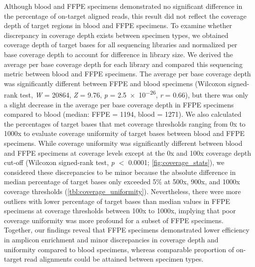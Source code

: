Although blood and FFPE specimens demonstrated no significant difference in the percentage of on-target aligned reads, this result did not reflect the coverage depth of target regions in blood and FFPE specimens. To examine whether discrepancy in coverage depth exists between specimen types, we obtained coverage depth of target bases for all sequencing libraries and normalized per base coverage depth to account for difference in library size. We derived the average per base coverage depth for each library and compared this sequencing metric between blood and FFPE specimens. The average per base coverage depth was significantly different between FFPE and blood specimens (Wilcoxon signed-rank test, \textit{W} = \num{20864}, \textit{Z} = 9.76, \textit{p} = \num{2.5e-26}, \textit{r} = 0.66), but there was only a slight decrease in the average per base coverage depth in FFPE specimens compared to blood (median: FFPE = 1194, blood = 1271). We also calculated the percentages of target bases that met coverage thresholds ranging from 0x to 1000x to evaluate coverage uniformity of target bases between blood and FFPE specimens. While coverage uniformity was significantly different between blood and FFPE specimens at coverage levels except at the 0x and 100x coverage depth cut-off (Wilcoxon signed-rank test, \textit{p} $<$ \num{0.0001}; \autoref{fig:coverage_stats}), we considered these discrepancies to be minor because the absolute difference in median percentage of target bases only exceeded 5\% at 500x, 900x, and 1000x coverage thresholds (\autoref{tbl:coverage_uniformity}). Nevertheless, there were more outliers with lower percentage of target bases than median values in FFPE specimens at coverage thresholds between 100x to 1000x, implying that poor coverage uniformity was more profound for a subset of FFPE specimens. Together, our findings reveal that FFPE specimens demonstrated lower efficiency in amplicon enrichment and minor discrepancies in coverage depth and uniformity compared to blood specimens, whereas comparable proportion of on-target read alignments could be attained between specimen types.


